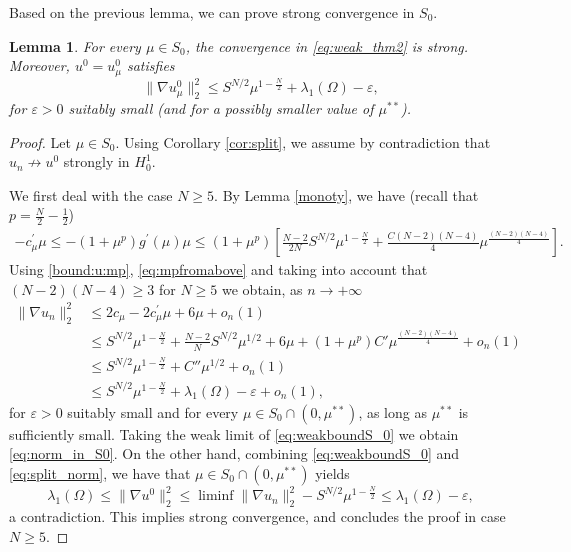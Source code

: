 \documentclass[10pt]{article}
\newcommand{\eps}{\varepsilon}
\newtheorem{lemma}[proposition]{Lemma}
\theoremstyle{definition}
\numberwithin{equation}{section}
\begin{document}
Based on the previous lemma, we can prove strong convergence in $S_0$.
%
\begin{lemma}\label{lem:ex_in_S0}
For every $\mu \in S_0$, the convergence in \eqref{eq:weak_thm2} is strong. Moreover,
$u^0= u^0_\mu$ satisfies
\begin{equation}\label{eq:norm_in_S0}
\|\nabla u_\mu^0\|_2^2 \le S^{N/2}\mu^{1-\frac{N}{2}} + \lambda_1(\Omega) - \eps,
\end{equation}
for  $\eps>0$ suitably small (and for a possibly smaller value of $\mu^{**}$).
\end{lemma}
%
\begin{proof}
Let $\mu\in S_0$. Using Corollary \ref{cor:split}, we assume by contradiction
that $u_n \not \to u^0$ strongly in $H^1_0$.

We first deal with the case $N\ge5$. By Lemma \ref{monoty}, we have (recall that $p=\frac{N}{2}-
\frac{1}{2}$)
\begin{equation*}
    \begin{aligned}\displaystyle
-c^{\prime}_{\mu}\mu\leq-(1+\mu^p)g^{\prime}(\mu)\mu\leq (1+\mu^p)\left[\frac{N-2}{2N}S^{N/2}\mu^{1-\frac{N}{2}}+\frac{C(N-2)(N-4)}{4}\mu^{\frac{(N-2)(N-4)}{4}}\right].
    \end{aligned}
\end{equation*}
Using \eqref{bound:u:mp}, \eqref{eq:mpfromabove} and taking into account that $(N-2)(N-4)\ge3$ for $N\ge5$ we obtain, as $n \to +\infty$
\begin{equation}\label{eq:weakboundS_0}
    \begin{aligned}\displaystyle
\|\nabla u_{n}\|_{2}^{2} &\le 2c_{\mu}-2c^{\prime}_{\mu}\mu+6\mu+o_{n}(1)\\
&\le S^{N/2}\mu^{1-\frac{N}{2}}+ \frac{N-2}{N}S^{N/2}\mu^{1/2}+6\mu+(1+\mu^p)C'\mu^{\frac{(N-2)(N-4)}{4}}+o_{n}(1)
\\
&\le S^{N/2}\mu^{1-\frac{N}{2}}+ C''\mu^{1/2}+o_{n}(1)
\\
&\le S^{N/2}\mu^{1-\frac{N}{2}}+ \lambda_1(\Omega) - \eps+o_{n}(1),
    \end{aligned}
\end{equation}
for $\eps>0$ suitably small and for every $\mu\in S_0\cap (0,\mu^{**})$, as long as
$\mu^{**}$ is sufficiently small. Taking the weak limit of \eqref{eq:weakboundS_0} we
obtain \eqref{eq:norm_in_S0}. On the other hand, combining \eqref{eq:weakboundS_0} and
\eqref{eq:split_norm}, we have that $\mu\in S_0\cap (0,\mu^{**})$
yields
\[
\lambda_1(\Omega)\le\|\nabla u^0\|_2^2 \le \liminf \|\nabla u_{n}\|_{2}^{2} - S^{N/2}
\mu^{1-\frac{N}{2}}\le\lambda_1(\Omega)-\eps,
\]
a contradiction. This implies strong convergence, and concludes the proof in case $N\ge5$.


\end{proof}
\end{document}

